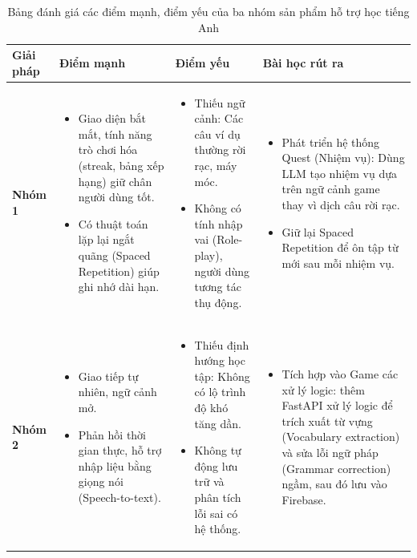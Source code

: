 \begin{table}[H]
\centering
\caption{Bảng đánh giá các điểm mạnh, điểm yếu của ba nhóm sản phẩm hỗ trợ học tiếng Anh}
\label{tab:danh-gia-giai-phap}
\small
\begin{tabularx}{\textwidth}{|l|X|X|X|}
\hline
\textbf{Giải pháp} & \textbf{Điểm mạnh} & \textbf{Điểm yếu} & \textbf{Bài học rút ra} \\ \hline
\textbf{Nhóm 1} & 
\begin{itemize}[leftmargin=*, nosep]
    \item Giao diện bắt mắt, tính năng trò chơi hóa (streak, bảng xếp hạng) giữ chân người dùng tốt.
    \item Có thuật toán lặp lại ngắt quãng (Spaced Repetition) giúp ghi nhớ dài hạn.
\end{itemize} & 
\begin{itemize}[leftmargin=*, nosep]
    \item Thiếu ngữ cảnh: Các câu ví dụ thường rời rạc, máy móc.
    \item Không có tính nhập vai (Role-play), người dùng tương tác thụ động.
\end{itemize} & 
\begin{itemize}[leftmargin=*, nosep]
    \item Phát triển hệ thống Quest (Nhiệm vụ): Dùng LLM tạo nhiệm vụ dựa trên ngữ cảnh game thay vì dịch câu rời rạc.
    \item Giữ lại Spaced Repetition để ôn tập từ mới sau mỗi nhiệm vụ.
\end{itemize} \\ \hline

\textbf{Nhóm 2} & 
\begin{itemize}[leftmargin=*, nosep]
    \item Giao tiếp tự nhiên, ngữ cảnh mở.
    \item Phản hồi thời gian thực, hỗ trợ nhập liệu bằng giọng nói (Speech-to-text).
\end{itemize} & 
\begin{itemize}[leftmargin=*, nosep]
    \item Thiếu định hướng học tập: Không có lộ trình độ khó tăng dần.
    \item Không tự động lưu trữ và phân tích lỗi sai có hệ thống.
\end{itemize} & 
\begin{itemize}[leftmargin=*, nosep]
    \item Tích hợp vào Game các xử lý logic: thêm FastAPI xử lý logic để trích xuất từ vựng (Vocabulary extraction) và sửa lỗi ngữ pháp (Grammar correction) ngầm, sau đó lưu vào Firebase.
\end{itemize} \\ \hline


\end{tabularx}
\end{table}
